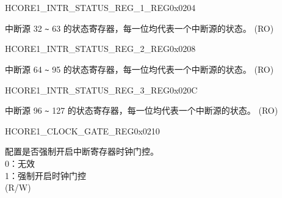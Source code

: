\begin{register}{H}{CORE1\_INTR\_STATUS\_REG\_1\_REG}{0x0204}\label{regdesc:CORE1INTRSTATUSREG1REG}
%
\regnewline%
\begin{regdesc}\begin{reglist}
\label{fielddesc:CORE1INTRSTATUS1}\item [CORE1\_INTR\_STATUS\_1] 中断源 32 \verb+~+ 63 的状态寄存器，每一位均代表一个中断源的状态。 (RO)
\end{reglist}\end{regdesc}
\end{register}


\begin{register}{H}{CORE1\_INTR\_STATUS\_REG\_2\_REG}{0x0208}\label{regdesc:CORE1INTRSTATUSREG2REG}
%
\regnewline%
\begin{regdesc}\begin{reglist}
\label{fielddesc:CORE1INTRSTATUS2}\item [CORE1\_INTR\_STATUS\_2] 中断源 64 \verb+~+ 95 的状态寄存器，每一位均代表一个中断源的状态。 (RO)
\end{reglist}\end{regdesc}
\end{register}


\begin{register}{H}{CORE1\_INTR\_STATUS\_REG\_3\_REG}{0x020C}\label{regdesc:CORE1INTRSTATUSREG3REG}
%
\regnewline%
\begin{regdesc}\begin{reglist}
\label{fielddesc:CORE1INTRSTATUS3}\item [CORE1\_INTR\_STATUS\_3] 中断源 96 \verb+~+ 127 的状态寄存器，每一位均代表一个中断源的状态。 (RO)
\end{reglist}\end{regdesc}
\end{register}


\begin{register}{H}{CORE1\_CLOCK\_GATE\_REG}{0x0210}\label{regdesc:CORE1CLOCKGATEREG}
%
%
\regnewline%
\begin{regdesc}\begin{reglist}
\label{fielddesc:CORE1REGCLKEN}\item [CORE1\_REG\_CLK\_EN] 配置是否强制开启中断寄存器时钟门控。\\
0：无效 \\
1：强制开启时钟门控 \\
(R/W)
\end{reglist}\end{regdesc}
\end{register}


